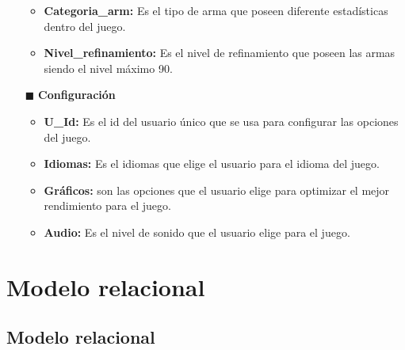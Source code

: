 \documentclass{report}
\begin{document}
\begin{itemize}
\begin{itemize}
            \item \textbf{Categoria\_arm:} Es el tipo de arma que poseen diferente estadísticas dentro del juego.
            \item \textbf{Nivel\_refinamiento:} Es el nivel de refinamiento que poseen las armas siendo el nivel máximo 90.
        \end{itemize}
    \item[$\blacksquare$]\textbf{Configuración}
        \begin{itemize}
            \item \textbf{U\_Id:} Es el id del usuario único que se usa para configurar las opciones del juego.
            \item \textbf{Idiomas:} Es el idiomas que elige el usuario para el idioma del juego.
            \item \textbf{Gráficos:} son las opciones que el usuario elige para optimizar el mejor rendimiento para el juego.
            \item \textbf{Audio:} Es el nivel de sonido que el usuario elige para el juego.
        \end{itemize}
\end{itemize}

\chapter{Modelo relacional}
\section{Modelo relacional}
\end{document}
